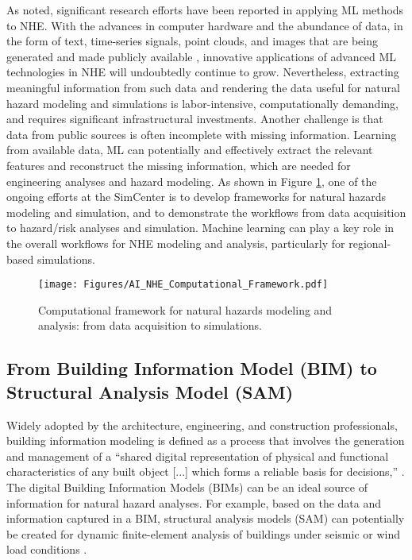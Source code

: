 As noted, significant research efforts have been reported in applying ML methods to NHE. With the advances in computer hardware and the abundance of data, in the form of text, time-series signals, point clouds, and images that are being generated and made publicly available \citep{rathje2017designsafe}, innovative applications of advanced ML technologies in NHE will undoubtedly continue to grow. Nevertheless, extracting meaningful information from such data and rendering the data useful for natural hazard modeling and simulations is labor-intensive, computationally demanding, and requires significant infrastructural investments. Another challenge is that data from public sources is often incomplete with missing information. Learning from available data, ML can potentially and effectively extract the relevant features and reconstruct the missing information, which are needed for engineering analyses and hazard modeling. As shown in Figure \ref{fig:AI_NHE_Computational_Framework}, one of the ongoing efforts at the SimCenter is to develop frameworks for natural hazards modeling and simulation, and to demonstrate the workflows from data acquisition to hazard/risk analyses and simulation. Machine learning can play a key role in the overall workflows for NHE modeling and analysis, particularly for regional-based simulations. 

\begin{figure}[htb]
    \centering
    \texttt{[image: Figures/AI\_NHE\_Computational\_Framework.pdf]}
    \caption{Computational framework for natural hazards modeling and analysis: from data acquisition to simulations.}
    \label{fig:AI_NHE_Computational_Framework}
\end{figure}

\subsection{From Building Information Model (BIM) to Structural Analysis Model (SAM)}

Widely adopted by the architecture, engineering, and construction professionals, building information modeling is defined as a process that involves the generation and management of a ``shared digital representation of physical and functional characteristics of any built object [...] which forms a reliable basis for decisions,'' \citep{iso2016building}. The digital Building Information Models (BIMs) can be an ideal source of information for natural hazard analyses. For example, based on the data and information captured in a BIM, structural analysis models (SAM) can potentially be created for dynamic finite-element analysis of buildings under seismic or wind load conditions \citep{lu2020cimpowered}. 

